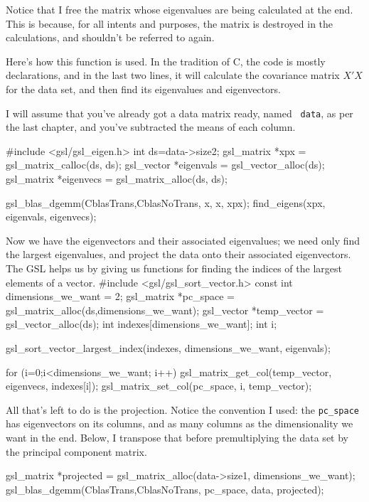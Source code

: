 Notice that I free the matrix whose eigenvalues are being calculated at the end.
This is because, for all intents and purposes, the matrix is destroyed in the
calculations, and shouldn't be referred to again. 

Here's how this function is used. In the tradition of C, the code is
mostly declarations, and in the last two lines, it will calculate the
covariance matrix $X'X$ for the data set, and then find its eigenvalues
and eigenvectors.

I will assume that you've already got a data matrix ready, named {\tt
data}, as per the last chapter, and you've subtracted the means of each
column.

#include <gsl/gsl_eigen.h>
int ds=data->size2;
gsl_matrix *xpx  = gsl_matrix_calloc(ds, ds);
gsl_vector *eigenvals   = gsl_vector_alloc(ds);
gsl_matrix *eigenvecs   = gsl_matrix_alloc(ds, ds);

gsl_blas_dgemm(CblasTrans,CblasNoTrans, x, x, xpx);
find_eigens(xpx, eigenvals, eigenvecs);

Now we have the eigenvectors and their associated eigenvalues; we need only find
the largest eigenvalues, and project the data onto their associated eigenvectors.
The GSL helps us by giving us functions for
finding the indices of the largest elements of a vector.
#include <gsl/gsl_sort_vector.h>
const int dimensions_we_want = 2;
gsl_matrix *pc_space 
               = gsl_matrix_alloc(ds,dimensions_we_want);
gsl_vector *temp_vector = gsl_vector_alloc(ds);
int indexes[dimensions_we_want];
int i;

gsl_sort_vector_largest_index(indexes, dimensions_we_want, eigenvals);

for (i=0;i<dimensions_we_want; i++){
   gsl_matrix_get_col(temp_vector, eigenvecs, indexes[i]);
   gsl_matrix_set_col(pc_space, i, temp_vector);
}

All that's left to do is the projection. Notice the convention I used:
the {\tt pc\_space} has eigenvectors on its columns, and as many columns as the
dimensionality we want in the end. Below, I transpose that before premultiplying
the data set by the principal component matrix.

gsl_matrix *projected 
                 = gsl_matrix_alloc(data->size1, dimensions_we_want);
gsl_blas_dgemm(CblasTrans,CblasNoTrans, pc_space, data, projected);

